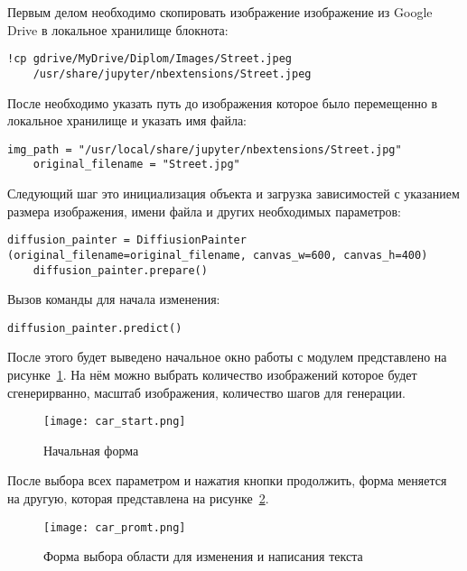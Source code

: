 Первым делом необходимо скопировать изображение изображение из Google Drive в локальное хранилище блокнота:

\begin{lstlisting}[basicstyle=\ttfamily\small]
    !cp gdrive/MyDrive/Diplom/Images/Street.jpeg 
    /usr/share/jupyter/nbextensions/Street.jpeg
\end{lstlisting}

После необходимо указать путь до изображения которое было перемещенно в локальное хранилище и указать имя файла:

\begin{lstlisting}[basicstyle=\ttfamily\small]
    img_path = "/usr/local/share/jupyter/nbextensions/Street.jpg"
    original_filename = "Street.jpg"
\end{lstlisting}

Следующий шаг это инициализация объекта и загрузка зависимостей с указанием размера изображения, имени файла и других необходимых параметров:

\begin{lstlisting}[basicstyle=\ttfamily\small]
    diffusion_painter = DiffiusionPainter (original_filename=original_filename, canvas_w=600, canvas_h=400)
    diffusion_painter.prepare()
\end{lstlisting}

Вызов команды для начала изменения:

\begin{lstlisting}[basicstyle=\ttfamily\small]
    diffusion_painter.predict()
\end{lstlisting}

После этого будет выведено начальное окно работы с модулем представлено на рисунке~\ref{man::car_start}. На нём можно выбрать количество изображений которое будет сгенерирванно, масштаб изображения, количество шагов для генерации.

\begin{figure}[ht]
    \centering
    \texttt{[image: car\_start.png]}
    \caption{Начальная форма}
    \label{man::car_start}
\end{figure}

После выбора всех параметром и нажатия кнопки продолжить, форма меняется на другую, которая представлена на рисунке~\ref{man::car_select}. 

\begin{figure}[ht]
    \centering
    \texttt{[image: car\_promt.png]}
    \caption{Форма выбора области для изменения и написания текста}
    \label{man::car_select}
\end{figure}

